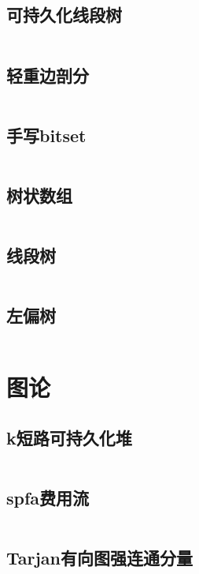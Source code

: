 \documentclass[UTF8]{ctexart}
\begin{document}
\subsection{可持久化线段树}
\inputminted{cpp}{datastructure/可持久化线段树.cpp}

\subsection{轻重边剖分}
\inputminted{cpp}{datastructure/轻重边剖分.cpp}

\subsection{手写bitset}
\inputminted{cpp}{datastructure/手写bitset.cpp}

\subsection{树状数组}
\inputminted{cpp}{datastructure/树状数组.cpp}

\subsection{线段树}
\inputminted{cpp}{datastructure/线段树.cpp}

\subsection{左偏树}
\inputminted{cpp}{datastructure/左偏树.cpp}

\section{图论}

\subsection{k短路可持久化堆}
\inputminted{cpp}{graphtheory/k短路可持久化堆.cpp}

\subsection{spfa费用流}
\inputminted{cpp}{graphtheory/spfa费用流.cpp}

\subsection{Tarjan有向图强连通分量}
\inputminted{cpp}{graphtheory/Tarjan有向图强连通分量.cpp}
\end{document}
